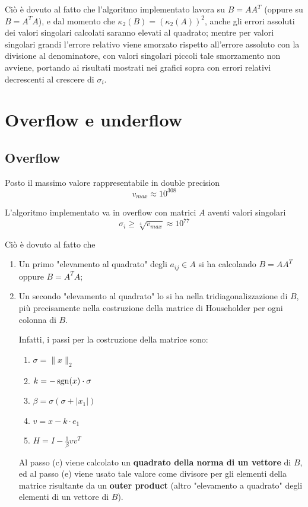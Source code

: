 Ciò è dovuto al fatto che l'algoritmo implementato lavora su $B = A A^T$ (oppure 
su $B = A^T A$), e dal momento che $\kappa_2(B) = (\kappa_2(A))^2$, anche gli 
errori assoluti dei valori singolari calcolati saranno elevati al quadrato; 
mentre per valori singolari grandi l'errore relativo viene smorzato rispetto 
all'errore assoluto con la divisione al denominatore, con valori singolari 
piccoli tale smorzamento non avviene, portando ai risultati mostrati nei grafici 
sopra con errori relativi decrescenti al crescere di $\sigma_i$.



\section{Overflow e underflow}
\subsection{Overflow}
Posto il massimo valore rappresentabile in double precision
\begin{equation*}
	v_{max} \approx 10^{308}
\end{equation*}

L'algoritmo implementato va in overflow con matrici $A$ aventi valori singolari
\begin{equation*}
	\sigma_i \geq \sqrt[4]{v_{max}} \approx 10^{77}
\end{equation*}

Ciò è dovuto al fatto che
\begin{enumerate}
	\item Un primo "elevamento al quadrato" degli $a_{ij} \in A$ si ha calcolando 
$B = A A^T$ oppure $B = A^T A$;
	\item Un secondo "elevamento al quadrato" lo si ha nella tridiagonalizzazione 
di $B$, più precisamente nella costruzione della matrice di Householder per ogni 
colonna di $B$.
	
	Infatti, i passi per la costruzione della matrice sono:
	\begin{enumerate}
		\item $\sigma = \| x \|_2$
		\item $k = -\operatorname{sgn}(x) \cdot \sigma$
		\item $\beta = \sigma (\sigma + | x_1 |)$
		\item $v = x - k \cdot e_1$
		\item $H = I - \frac{1}{\beta}v v^T $
	\end{enumerate}
	
	Al passo (c) viene calcolato un \textbf{quadrato della norma di un vettore} di 
$B$, ed al passo (e) viene usato tale valore come divisore per gli elementi 
della matrice risultante da un \textbf{outer product} (altro "elevamento a 
quadrato" degli elementi di un vettore di $B$).
\end{enumerate}

